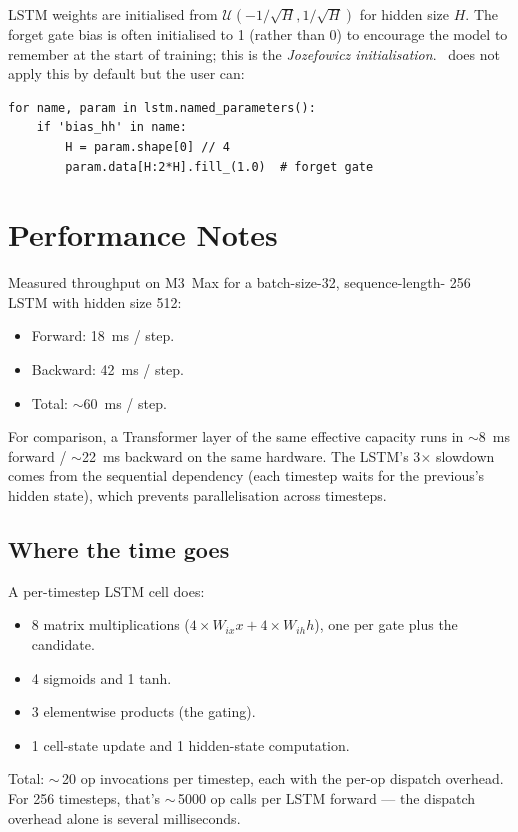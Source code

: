 LSTM weights are initialised from
$\mathcal{U}(-1/\sqrt{H}, 1/\sqrt{H})$ for hidden size $H$. The
forget gate bias is often initialised to 1 (rather than 0) to
encourage the model to remember at the start of training; this is
the \emph{Jozefowicz initialisation}. \Lucid\ does not apply this
by default but the user can:

\begin{lstlisting}[style=lucid,language=LucidPython]
for name, param in lstm.named_parameters():
    if 'bias_hh' in name:
        H = param.shape[0] // 4
        param.data[H:2*H].fill_(1.0)  # forget gate
\end{lstlisting}

\section{Performance Notes}
\label{sec:rnn_family:perf}

Measured throughput on M3~Max for a batch-size-32, sequence-length-
256 LSTM with hidden size 512:

\begin{itemize}
  \item Forward: 18~ms / step.
  \item Backward: 42~ms / step.
  \item Total: $\sim$60~ms / step.
\end{itemize}

For comparison, a Transformer layer of the same effective
capacity runs in $\sim$8~ms forward / $\sim$22~ms backward on
the same hardware. The LSTM's 3$\times$ slowdown comes from the
sequential dependency (each timestep waits for the previous's
hidden state), which prevents parallelisation across timesteps.

\subsection{Where the time goes}
\label{ssec:rnn_family:perf_breakdown}

A per-timestep LSTM cell does:
\begin{itemize}
  \item 8 matrix multiplications ($4 \times W_{ix} x + 4 \times W_{ih} h$),
    one per gate plus the candidate.
  \item 4 sigmoids and 1 tanh.
  \item 3 elementwise products (the gating).
  \item 1 cell-state update and 1 hidden-state computation.
\end{itemize}
Total: $\sim$\,20 op invocations per timestep, each with the
per-op dispatch overhead. For 256 timesteps, that's
$\sim$\,5000 op calls per LSTM forward --- the dispatch
overhead alone is several milliseconds.

